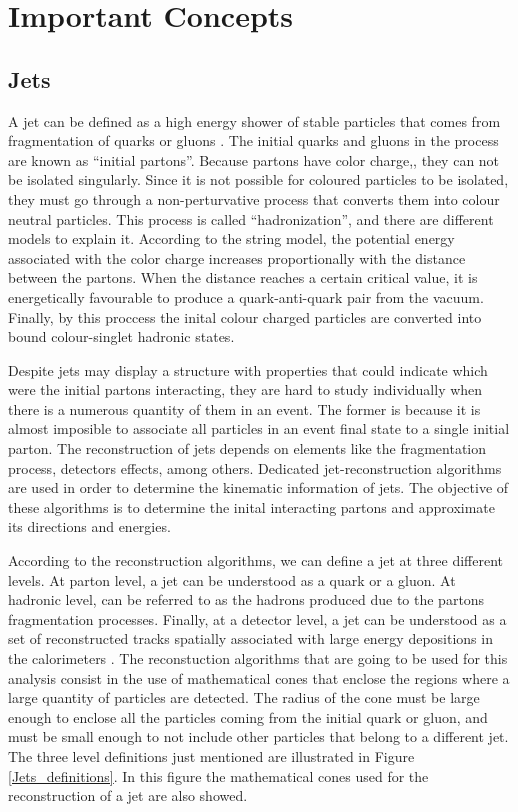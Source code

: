  \chapter{Important Concepts}
 \label{Important_concepts_chapter}
 
 \section{Jets}
 A jet can be defined as a high energy shower of stable particles that comes from fragmentation of quarks or gluons \cite{Particle_Detectors_Claus}. The initial quarks and gluons in the process are known as ``initial partons''. Because partons have color charge,, they can not be isolated singularly. Since it is not possible for coloured particles to be isolated, they must go through a non-perturvative process that converts them into colour neutral particles. This process is called ``hadronization'', and there are different models to explain it. According to the string model, the potential energy associated with the color charge increases proportionally with the distance between the partons. When the distance reaches a certain critical value, it is energetically favourable to produce a quark-anti-quark pair from the vacuum. Finally, by this proccess the inital colour charged particles are converted into bound colour-singlet hadronic states.  
 
 Despite jets may display a structure with properties that could indicate which were the initial partons interacting, they are hard to study individually when there is a numerous quantity of them
 in an event. The former is because it is almost imposible to associate all particles in an event final state to a single initial parton. The reconstruction of jets depends on elements like the 
 fragmentation process, detectors effects, among others. Dedicated jet-reconstruction algorithms are used in order to determine the kinematic information of jets. The objective of these algorithms is to determine the inital interacting partons and approximate its directions and energies.

According to the reconstruction algorithms, we can define a jet at three different levels. At parton level, a jet can be understood as a quark or a gluon. At hadronic level, can be referred to as the hadrons produced due to the partons fragmentation processes. Finally, at a detector level, a jet can be understood as a set of reconstructed tracks spatially associated with large energy depositions in the calorimeters \cite{Tesis_luis_alfredo}. The reconstuction algorithms that are going to be used for this analysis consist in the use of mathematical cones that enclose the regions where a large quantity of particles are detected. The radius of the cone must be large enough to enclose all the particles coming from the initial quark or gluon, and must be small enough to not include other particles that belong to a different jet. The three level definitions just mentioned are illustrated in Figure \ref{Jets_definitions}. In this figure the mathematical cones used for the reconstruction of a jet are also showed.
  
